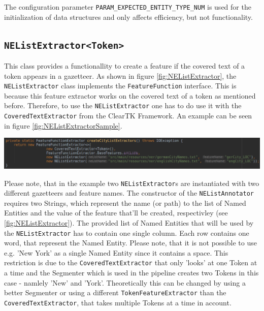 \documentclass[11pt, english]{article}
\begin{document}
The configuration parameter \verb/PARAM_EXPECTED_ENTITY_TYPE_NUM/ is used for the initialization of data structures and only affects efficiency, but not functionality.

\subsection{\texttt{NEListExtractor<Token>}}
\label{sec:NEListExtractor}
This class provides a functionallity to create a feature if the covered text of a token appears in a gazetteer. As shown in figure \ref{fig:NEListExtractor}, the \verb/NEListExtractor/ class implements the \verb/FeatureFunction/ interface. This is because this feature extractor works on the covered text of a token as mentioned before. Therefore, to use the \verb/NEListExtractor/ one has to do use it with the \verb/CoveredTextExtractor/ from the ClearTK Framework. An example can be seen in figure \ref{fig:NEListExtractorSample}.

\includegraphics[width=\linewidth, keepaspectratio]{gfx/createNEListExtractor.png}
\label{fig:NEListExtractorSample}

Please note, that in the example two \verb/NEListExtractor/s are instantiated with two different gazetteers and feature names. The constructor of the \verb/NEListAnnotator/ requires two Strings, which represent the name (or path) to the list of Named Entities and the value of the feature that'll be created, respectivley (see \ref{fig:NEListExtractor}). The provided list of Named Entities that will be used by the \verb/NEListExtractor/ has to contain one single column. Each row contains one word, that represent the Named Entity. Please note, that it is not possible to use e.g. 'New York' as a single Named Entity since it contains a space. This restriction is due to the \verb/CoveredTextExtractor/ that only 'looks' at one Token at a time and the Segmenter which is used in the pipeline creates two Tokens in this case - namlely 'New' and 'York'. Theoretically this can be changed by using a better Segmenter or using a different \verb/TokenFeatureExtractor/ than the \verb/CoveredTextExtractor/, that takes multiple Tokens at a time in account.
\end{document}
